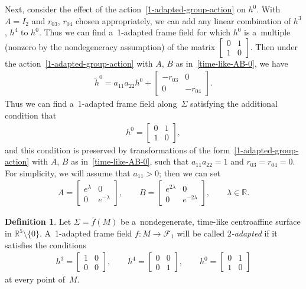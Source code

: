 \documentclass[pdftex]{sigma}
\numberwithin{equation}{section}
\theoremstyle{definition}
\newtheorem{dfn}[teo]{Definition}
\begin{document}
Next, consider the ef\/fect of the action~\eqref{1-adapted-group-action} on $h^0$.
With $A = I_2$ and $r_{03}$, $r_{04}$ chosen appropriately, we can add any linear combination of $h^3$, $h^4$ to $h^0$.
Thus we can f\/ind a~1-adapted frame f\/ield for which $h^0$ is a~multiple (nonzero by the nondegeneracy assumption) of the
matrix $
\begin{bmatrix}
0 & 1
\\
1 & 0
\end{bmatrix}
$.
Then under the action~\eqref{1-adapted-group-action} with $A$, $B$ as in~\eqref{time-like-AB-0}, we have
\begin{gather*}
\tilde{h}^0 = a_{11} a_{22} h^0 +
\begin{bmatrix}
-r_{03} & 0
\\
0 & -r_{04}
\end{bmatrix}.
\end{gather*}
Thus we can f\/ind a~1-adapted frame f\/ield along~$\Sigma$ satisfying the additional condition that
\begin{gather*}
h^0 =
\begin{bmatrix}
0 & 1
\\
1 & 0
\end{bmatrix},
\end{gather*}
and this condition is preserved by transformations of the form~\eqref{1-adapted-group-action} with $A$, $B$ as
in~\eqref{time-like-AB-0}, such that $a_{11} a_{22}=1$ and $r_{03} = r_{04} = 0$.
For simplicity, we will assume that $a_{11} > 0$; then we can set
\begin{gather*}
A=
\begin{bmatrix}
e^\lambda & 0
\\
0 & e^{-\lambda}
\end{bmatrix},
\qquad
B =
\begin{bmatrix}
e^{2\lambda} & 0
\\
0 & e^{-2\lambda}
\end{bmatrix},
\qquad
\lambda \in \mathbb{R}.
\end{gather*}

\begin{dfn}
Let $\Sigma = \bar{f}(M)$ be a~nondegenerate, time-like centroaf\/f\/ine surface in $\mathbb{R}^5 \setminus \{0\}$.
A~1-adapted frame f\/ield $f:M \to \mathcal{F}_1$ will be called {\em $2$-adapted} if it satisf\/ies the conditions
\begin{gather}
h^3 =
\begin{bmatrix}
1 & 0
\\
0 & 0
\end{bmatrix},
\qquad
h^4 =
\begin{bmatrix}
0 & 0
\\
0 & 1
\end{bmatrix},
\qquad
h^0 =
\begin{bmatrix}
0 & 1
\\
1 & 0
\end{bmatrix}
\label{2-adapted-time-like-h}
\end{gather}
at every point of~$M$.
\end{dfn}
\end{document}
